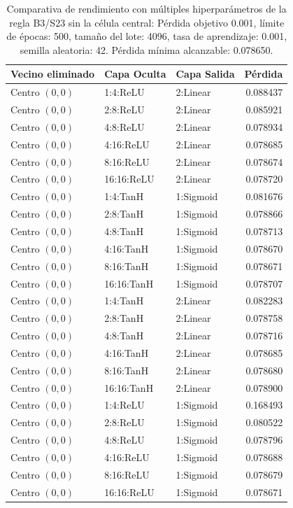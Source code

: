 \begin{table}[h]
	\centering
	\begin{tabular}{lllr}
		\toprule
		\textbf{Vecino eliminado} & \textbf{Capa Oculta} & \textbf{Capa Salida} & \textbf{Pérdida} \\
		\midrule
		Centro $(0,0)$ & 1:4:ReLU & 2:Linear & 0.088437 \\
		Centro $(0,0)$ & 2:8:ReLU & 2:Linear & 0.085921 \\
		Centro $(0,0)$ & 4:8:ReLU & 2:Linear & 0.078934 \\
		Centro $(0,0)$ & 4:16:ReLU & 2:Linear & 0.078685 \\
		Centro $(0,0)$ & 8:16:ReLU & 2:Linear & 0.078674 \\
		Centro $(0,0)$ & 16:16:ReLU & 2:Linear & 0.078720 \\
		Centro $(0,0)$ & 1:4:TanH & 1:Sigmoid & 0.081676 \\
		Centro $(0,0)$ & 2:8:TanH & 1:Sigmoid & 0.078866 \\
		Centro $(0,0)$ & 4:8:TanH & 1:Sigmoid & 0.078713 \\
		Centro $(0,0)$ & 4:16:TanH & 1:Sigmoid & 0.078670 \\
		Centro $(0,0)$ & 8:16:TanH & 1:Sigmoid & 0.078671 \\
		Centro $(0,0)$ & 16:16:TanH & 1:Sigmoid & 0.078707 \\
		Centro $(0,0)$ & 1:4:TanH & 2:Linear & 0.082283 \\
		Centro $(0,0)$ & 2:8:TanH & 2:Linear & 0.078758 \\
		Centro $(0,0)$ & 4:8:TanH & 2:Linear & 0.078716 \\
		Centro $(0,0)$ & 4:16:TanH & 2:Linear & 0.078685 \\
		Centro $(0,0)$ & 8:16:TanH & 2:Linear & 0.078680 \\
		Centro $(0,0)$ & 16:16:TanH & 2:Linear & 0.078900 \\
		Centro $(0,0)$ & 1:4:ReLU & 1:Sigmoid & 0.168493 \\
		Centro $(0,0)$ & 2:8:ReLU & 1:Sigmoid & 0.080522 \\
		Centro $(0,0)$ & 4:8:ReLU & 1:Sigmoid & 0.078796 \\
		Centro $(0,0)$ & 4:16:ReLU & 1:Sigmoid & 0.078688 \\
		Centro $(0,0)$ & 8:16:ReLU & 1:Sigmoid & 0.078679 \\
		Centro $(0,0)$ & 16:16:ReLU & 1:Sigmoid & 0.078671 \\
		\bottomrule
	\end{tabular}
	\caption{Comparativa de rendimiento con múltiples hiperparámetros de la regla B3/S23 sin la célula central: Pérdida objetivo 0.001, límite de épocas: 500, tamaño del lote: 4096, tasa de aprendizaje: 0.001, semilla aleatoria: 42. Pérdida mínima alcanzable: 0.078650.}
	\label{tab:nca_gol_reduction_centro}
\end{table}
